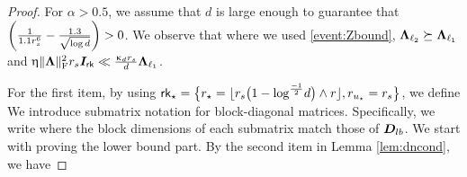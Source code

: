 \begin{proof}
For $\alpha > 0.5$,  we assume that $d$ is large enough to guarantee that $\left( \frac{1}{1.1 r_s^6} - \frac{1.3}{\sqrt{\log d}}  \right)  > 0$.  We observe that  
where we used \ref{event:Zbound}, $\boldsymbol{\Lambda}_{\ell_2} \succeq \boldsymbol{\Lambda}_{\ell_1}$ and $\upeta \lVert\boldsymbol{\Lambda}\rVert_\mathrm{F}^2 r_s \boldsymbol{I}_{\mathsf{rk}} \ll \tfrac{\upkappa_d r_s}{d} \boldsymbol{\Lambda}_{\ell_1}$.

\smallskip
For the first item,  by using $\mathsf{rk}_{\star} = \big \{ r_{\star} = 
\lfloor  r_s \big(1 -  \log^{\frac{-1}{2}} \! d  \big) \wedge r\rfloor, 
 r_{u_\star} =  r_s \big \}$,  we define  
We introduce submatrix notation for block-diagonal matrices. Specifically, we write
where the block dimensions of each submatrix match those of $\boldsymbol{D}_{lb}$.  We start with proving the lower bound part.  By the second item in Lemma \ref{lem:dncond},  we have
\end{proof}
